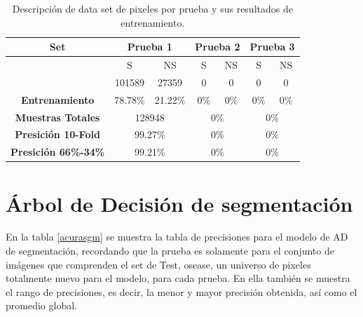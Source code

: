 \documentclass[twoside,spanish,ESP,MSc]{plantillaLabUPV}
\theoremstyle{definition}
\begin{document}
\begin{table}[h]
	\caption{Descripción de data set de pixeles por prueba y sus resultados de entrenamiento.}
	\label{pixet}
	\centering
	\begin{tabular}{|c|c|c|c|c|c|c|}
		\hline
		\textbf{Set}                             & \multicolumn{2}{c|}{\textbf{Prueba 1}}               & \multicolumn{2}{c|}{\textbf{Prueba 2}}               & \multicolumn{2}{c|}{\textbf{Prueba 3}}               \\ \hline
		& {\color[HTML]{000000} S} & {\color[HTML]{000000} NS} & {\color[HTML]{000000} S} & {\color[HTML]{000000} NS} & {\color[HTML]{000000} S} & {\color[HTML]{000000} NS} \\ \cline{2-7} 
		& 101589                   & 27359                     & 0                        & 0                         & 0                        & 0                         \\ \cline{2-7} 
		\multirow{-3}{*}{\textbf{Entrenamiento}} & 78.78\%                  & 21.22\%                   & 0\%                      & 0\%                       & 0\%                      & 0\%                       \\ \hline
		\textbf{Muestras Totales}                & \multicolumn{2}{c|}{{\color[HTML]{000000} 128948}}   & \multicolumn{2}{c|}{{\color[HTML]{000000} 0\%}}      & \multicolumn{2}{c|}{{\color[HTML]{000000} 0\%}}      \\ \hline
		\textbf{Presición 10-Fold}               & \multicolumn{2}{c|}{99.27\%}                         & \multicolumn{2}{c|}{0\%}                             & \multicolumn{2}{c|}{0\%}                             \\ \hline
		\textbf{Presición 66\%-34\%}             & \multicolumn{2}{c|}{99.21\%}                         & \multicolumn{2}{c|}{0\%}                             & \multicolumn{2}{c|}{0\%}                             \\ \hline
	\end{tabular}
\end{table}

\section{Árbol de Decisión de segmentación}

En la tabla \ref{acurasgm} se muestra la tabla de precisiones para el modelo de AD de segmentación, recordando que la prueba es solamente para el conjunto de imágenes que comprenden el set de Test, osease, un universo de pixeles totalmente nuevo para el modelo, para cada prueba. En ella también se muestra el rango de precisiones, es decir, la menor y mayor precisión obtenida, así como el promedio global.  
\end{document}

